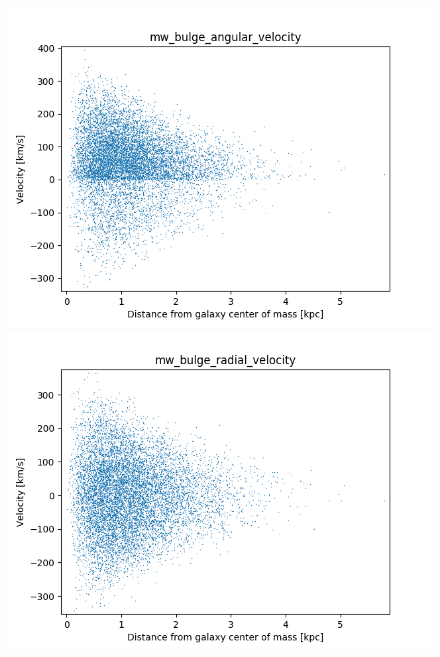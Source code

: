 \documentclass[a4paper,12pt, english]{article}
\begin{document}
\begin{figure}
\centering
\begin{minipage}{0.45\textwidth}
  \centering
\includegraphics[width=1\textwidth]{VelocityDistr/mw_bulge_angular_velocity.png}
\end{minipage}
\begin{minipage}{0.45\textwidth}
  \centering
\includegraphics[width=1\textwidth]{VelocityDistr/mw_bulge_radial_velocity.png}
\end{minipage}
\begin{minipage}{0.45\textwidth}
  \centering

\end{minipage}
\end{figure}
\end{document}
